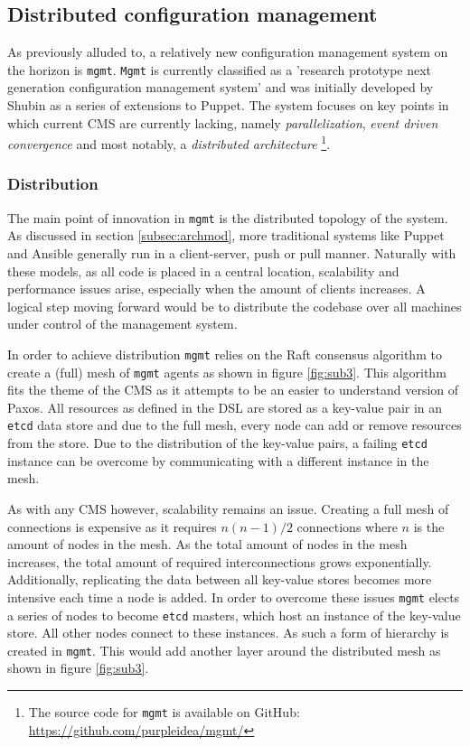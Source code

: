 \subsection{Distributed configuration management}\label{subsec:distributedmgmt}
As previously alluded to, a relatively new configuration management system on the horizon is \texttt{mgmt}. \texttt{Mgmt} is currently classified as a 'research prototype next generation configuration management system' and was initially developed by Shubin \cite{shubin2016} as a series of extensions to Puppet. The system focuses on key points in which current CMS are currently lacking, namely \textit{parallelization}, \textit{event driven convergence} and most notably, a \textit{distributed architecture} \footnote{The source code for \texttt{mgmt} is available on GitHub: \url{https://github.com/purpleidea/mgmt/}}. 

\subsubsection{Distribution}
The main point of innovation in \texttt{mgmt} is the distributed topology of the system. As discussed in section \ref{subsec:archmod}, more traditional systems like Puppet and Ansible generally run in a client-server, push or pull manner. Naturally with these models, as all code is placed in a central location, scalability and performance issues arise, especially when the amount of clients increases. A logical step moving forward would be to distribute the codebase over all machines under control of the management system. 

In order to achieve distribution \texttt{mgmt} relies on the Raft \cite{ongaro_2016} consensus algorithm to create a (full) mesh of \texttt{mgmt} agents as shown in figure \ref{fig:sub3}. This algorithm fits the theme of the CMS as it attempts to be an easier to understand version of Paxos. All resources as defined in the DSL are stored as a key-value pair in an \texttt{etcd} data store and due to the full mesh, every node can add or remove resources from the store. Due to the distribution of the key-value pairs, a failing \texttt{etcd} instance can be overcome by communicating with a different instance in the mesh. 

As with any CMS however, scalability remains an issue. Creating a full mesh of connections is expensive as it requires $n(n-1)/2$ connections where $n$ is the amount of nodes in the mesh. As the total amount of nodes in the mesh increases, the total amount of required interconnections grows exponentially. Additionally, replicating the data between all key-value stores becomes more intensive each time a node is added. In order to overcome these issues \texttt{mgmt} elects a series of nodes to become \texttt{etcd} masters, which host an instance of the key-value store. All other nodes connect to these instances. As such a form of hierarchy is created in \texttt{mgmt}. This would add another layer around the distributed mesh as shown in figure \ref{fig:sub3}.

